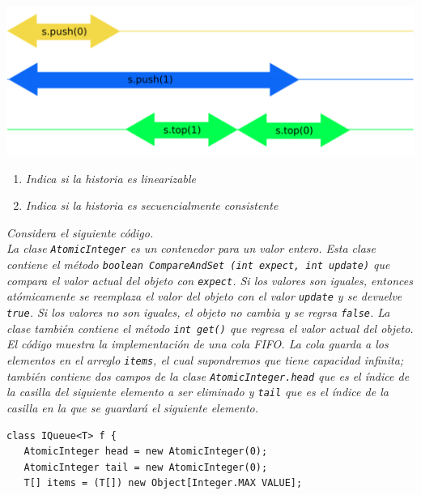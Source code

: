 \documentclass{article}
\begin{document}
\begin{enumerate}
{\begin{itemize}
{    \begin{centering}
      \includegraphics[scale=0.27]{figure1}
    \end{centering}
  }
\end{itemize}

\begin{enumerate}
  \item{\textsl{Indica si la historia es linearizable}}
  \item{\textsl{Indica si la historia es secuencialmente consistente}}
\end{enumerate}

\item{\textsl{
      Considera el siguiente código.\\
      La clase \texttt{AtomicInteger} es un contenedor para un valor
      entero. Esta clase contiene el método \texttt{boolean
        CompareAndSet (int expect, int update)} que compara el valor
      actual del objeto con \texttt{expect}. Si los valores son
      iguales, entonces atómicamente se reemplaza el valor del objeto
      con el valor \texttt{update} y se devuelve \texttt{true}. Si los
      valores no son iguales, el objeto no cambia y se regrsa
      \texttt{false}. La clase también contiene el método \texttt{int
        get()} que regresa el valor actual del objeto.\\
      El código muestra la implementación de una cola FIFO. La cola
      guarda a los elementos en el arreglo \texttt{items}, el cual
      supondremos que tiene capacidad infinita; también contiene dos
      campos de la clase \texttt{AtomicInteger.head} que es el índice
      de la casilla del siguiente elemento a ser eliminado y
      \texttt{tail} que es el índice de la casilla en la que se
      guardará el siguiente elemento.
    }

    \renewcommand{\lstlistingname}{}
\begin{lstlisting}[frame=single]
class IQueue<T> f {
   AtomicInteger head = new AtomicInteger(0);
   AtomicInteger tail = new AtomicInteger(0);
   T[] items = (T[]) new Object[Integer.MAX VALUE];
   

\end{lstlisting}}}
\end{enumerate}
\end{document}
